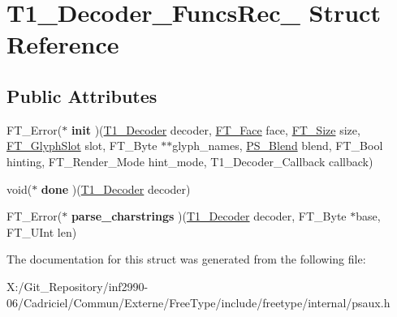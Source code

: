 \hypertarget{struct_t1___decoder___funcs_rec__}{\section{T1\-\_\-\-Decoder\-\_\-\-Funcs\-Rec\-\_\- Struct Reference}
\label{struct_t1___decoder___funcs_rec__}
}
\subsection*{Public Attributes}
\begin{DoxyCompactItemize}
\item 
\hypertarget{struct_t1___decoder___funcs_rec___a10baf5f433631fb6e73e639fca7e9478}{F\-T\-\_\-\-Error($\ast$ {\bfseries init} )(\hyperlink{struct_t1___decoder_rec__}{T1\-\_\-\-Decoder} decoder, \hyperlink{struct_f_t___face_rec__}{F\-T\-\_\-\-Face} face, \hyperlink{struct_f_t___size_rec__}{F\-T\-\_\-\-Size} size, \hyperlink{struct_f_t___glyph_slot_rec__}{F\-T\-\_\-\-Glyph\-Slot} slot, F\-T\-\_\-\-Byte $\ast$$\ast$glyph\-\_\-names, \hyperlink{struct_p_s___blend_rec__}{P\-S\-\_\-\-Blend} blend, F\-T\-\_\-\-Bool hinting, F\-T\-\_\-\-Render\-\_\-\-Mode hint\-\_\-mode, T1\-\_\-\-Decoder\-\_\-\-Callback callback)}\label{struct_t1___decoder___funcs_rec___a10baf5f433631fb6e73e639fca7e9478}

\item 
\hypertarget{struct_t1___decoder___funcs_rec___a2d76ed11eab173c09dc8f5cde75a64ee}{void($\ast$ {\bfseries done} )(\hyperlink{struct_t1___decoder_rec__}{T1\-\_\-\-Decoder} decoder)}\label{struct_t1___decoder___funcs_rec___a2d76ed11eab173c09dc8f5cde75a64ee}

\item 
\hypertarget{struct_t1___decoder___funcs_rec___a921b7ac2c00f97c425643c5a612b3c38}{F\-T\-\_\-\-Error($\ast$ {\bfseries parse\-\_\-charstrings} )(\hyperlink{struct_t1___decoder_rec__}{T1\-\_\-\-Decoder} decoder, F\-T\-\_\-\-Byte $\ast$base, F\-T\-\_\-\-U\-Int len)}\label{struct_t1___decoder___funcs_rec___a921b7ac2c00f97c425643c5a612b3c38}

\end{DoxyCompactItemize}


The documentation for this struct was generated from the following file\-:\begin{DoxyCompactItemize}
\item 
X\-:/\-Git\-\_\-\-Repository/inf2990-\/06/\-Cadriciel/\-Commun/\-Externe/\-Free\-Type/include/freetype/internal/psaux.\-h\end{DoxyCompactItemize}
